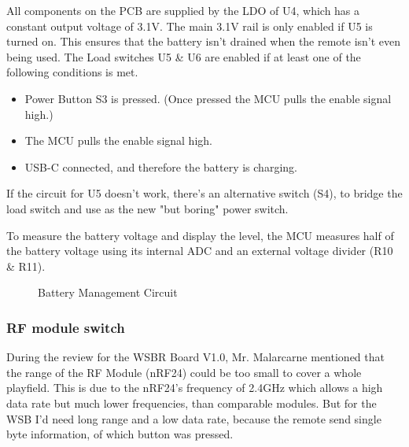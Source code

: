 All components on the PCB are supplied by the LDO of U4, which has a constant output voltage of 3.1V. The main 3.1V rail is only enabled if U5 is turned on. This ensures that the battery isn't drained when the remote isn't even being used. The Load switches U5 \& U6 are enabled if at least one of the following conditions is met.
\begin{itemize}
    \item Power Button S3 is pressed. (Once pressed the MCU pulls the enable signal high.)
    \item The MCU pulls the enable signal high.
    \item USB-C connected, and therefore the battery is charging.
\end{itemize}
If the circuit for U5 doesn't work, there's an alternative switch (S4), to bridge the load switch and use as the new "but boring" power switch.

To measure the battery voltage and display the level, the MCU measures half of the battery voltage using its internal ADC and an external voltage divider (R10 \& R11).

\begin{figure}[H]
	\centering
	\caption{Battery Management Circuit}
	\label{fig:Battery Management Circuit}
\end{figure}

\subsubsection{RF module switch}
\label{sssec:RF module switch}
During the review for the WSBR Board V1.0, Mr. Malarcarne mentioned that the range of the RF Module (nRF24) could be too small to cover a whole playfield. This is due to the nRF24's frequency of 2.4GHz which allows a high data rate but much lower frequencies, than comparable modules. But for the WSB I'd need long range and a low data rate, because the remote send single byte information, of which button was pressed.

